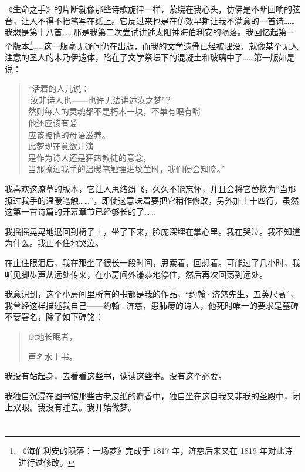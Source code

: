 \documentclass[AutoFakeBold=true]{book}
\begin{document}
《生命之手》的片断就像那些诗歌旋律一样，萦绕在我心头，仿佛是不断回响的弦音，让人不得不抬笔写在纸上。它反过来也是在仿效早期让我不满意的一首诗……我想是第十八首……那是我第二次尝试讲述太阳神海伯利安的陨落。我回忆起第一个版本\footnote{《海伯利安的陨落：一场梦》完成于 1817 年，济慈后来又在 1819 年对此诗进行过修改。}……这一版毫无疑问仍在出版，而我的文学遗骨已经被埋没，就像某个无人注意的圣人的木乃伊遗体，陷在了文学祭坛下的混凝土和玻璃中了……第一版如是说：

\begin{quote}
	{\kaishu ``活着的人儿说：\\
	`汝非诗人也——也许无法讲述汝之梦'？\\
	然则每人的灵魂都不是朽木一块，不单有眼有嘴\\
	他还应该有爱\\
	应该被他的母语滋养。\\
	此梦现在意欲开演\\
	是作为诗人还是狂热教徒的意念，\\
	当那撩过我手的温暖笔触埋进坟茔时，我们便会知晓。''}
\end{quote}

我喜欢这潦草的版本，它让人思绪纷飞，久久不能忘怀，并且会将它替换为``当那撩过我手的温暖笔触……''，即使这意味着要把它稍作修改，另外加上十四行，虽然这第一首诗篇的开幕章节已经够长的了……

我摇摇晃晃地退回到椅子上，坐了下来，脸庞深埋在掌心里。我在哭泣。我不知道为什么。我止不住地哭泣。

在止住眼泪后，我在那坐了很长一段时间，思索着，回想着。可能过了几小时，我听见脚步声从远处传来，在小房间外谦恭地停住，然后再次回荡到远处。

我意识到，这个小房间里所有的书都是我的作品，``约翰·济慈先生，五英尺高''，我曾经这样描述我自己——约翰·济慈，患肺痨的诗人，他死时唯一的要求是墓碑不要署名，除了如下碑铭：

\begin{quote}
	\begin{center}
		{\heiti 此地长眠者，

		声名水上书。}
	\end{center}
\end{quote}

我没有站起身，去看看这些书，读读这些书。没有这个必要。

我独自沉浸在图书馆那些古老皮纸的麝香中，独自坐在这自我又非我的圣殿中，闭上双眼。我没有睡去。我开始做梦。

\chapter{}
\end{document}
